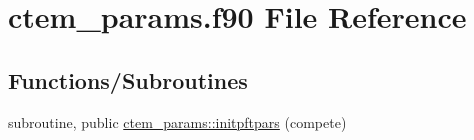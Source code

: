 \hypertarget{ctem__params_8f90}{}\section{ctem\+\_\+params.\+f90 File Reference}
\label{ctem__params_8f90}
\subsection*{Functions/\+Subroutines}
{\bf }\par
\begin{DoxyCompactItemize}
\item 
subroutine, public \hyperlink{group__ctem__params__initpftpars_ga766b01bfb91b339c953fe72266c10aaf}{ctem\+\_\+params\+::initpftpars} (compete)
\end{DoxyCompactItemize}

